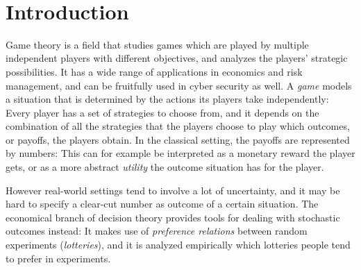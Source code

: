 \documentclass[a4paper,DIV=11,abstracton,twoside=semi]{scrreprt}
\theoremstyle{definition}
\begin{document}
    \newpage\thispagestyle{empty}~
    
    \chapter{Introduction}
    Game theory is a field that studies games which are played by multiple independent players with different objectives, and analyzes the players' strategic possibilities.
    It has a wide range of applications in economics and risk management, and can be fruitfully used in cyber security as well.
    A \emph{game} models a situation that is determined by the actions its players take independently: Every player has a set of strategies to choose from, and it depends on the combination of all the strategies that the players choose to play which outcomes, or payoffs, the players obtain. In the classical setting, the payoffs are represented by numbers: This can for example be interpreted as a monetary reward the player gets, or as a more abstract \emph{utility} the outcome situation has for the player.
    
    However real-world settings tend to involve a lot of uncertainty, and it may be hard to specify a clear-cut number as outcome of a certain situation. The economical branch of decision theory provides tools for dealing with stochastic outcomes instead: It makes use of \emph{preference relations} between random experiments (\emph{lotteries}), and it is analyzed empirically which lotteries people tend to prefer in experiments.
    
\end{document}
